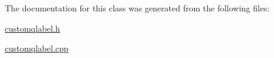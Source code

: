 The documentation for this class was generated from the following files\+:\begin{DoxyCompactItemize}
\item 
\mbox{\hyperlink{customqlabel_8h}{customqlabel.\+h}}\item 
\mbox{\hyperlink{customqlabel_8cpp}{customqlabel.\+cpp}}\end{DoxyCompactItemize}
